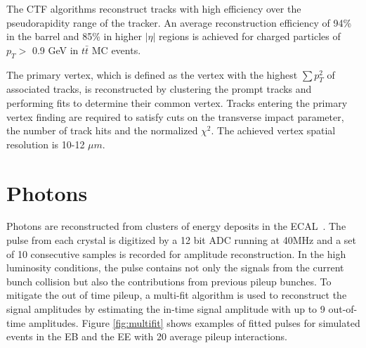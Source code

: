\documentclass[thesis.tex]{subfiles}
\begin{document}
The CTF algorithms reconstruct tracks with high efficiency over the pseudorapidity range of the tracker.
An average reconstruction efficiency of 94\% in the barrel and 85\% in higher $|\eta|$ regions is achieved for charged particles of $p_T >$ 0.9 GeV in $t\bar{t}$ MC events. 

The primary vertex, which is defined as the vertex with the highest $\sum p_T^2$ of associated tracks, is reconstructed by clustering the prompt tracks and performing fits to determine their common vertex. 
Tracks entering the primary vertex finding are required to satisfy cuts on the transverse impact parameter, the number of track hits and the normalized $\chi^2$.
The achieved vertex spatial resolution is 10-12 $\mu m$.

\section{Photons}
\label{sec:reco-photon}

Photons are reconstructed from clusters of energy deposits in the ECAL~\cite{PhotonPF}.
The pulse from each crystal is digitized by a 12 bit ADC running at 40MHz and a set of 10 consecutive samples is recorded for amplitude reconstruction.
In the high luminosity conditions, the pulse contains not only the signals from the current bunch collision but also the contributions from previous pileup bunches.
To mitigate the out of time pileup, a multi-fit algorithm is used to reconstruct the signal amplitudes by estimating the in-time signal amplitude with up to 9 out-of-time amplitudes.
Figure \ref{fig:multifit} shows examples of fitted pulses for simulated events in the EB and the EE with 20 average pileup interactions.
\end{document}

